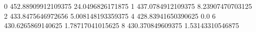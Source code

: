 0 452.88909912109375 24.0496826171875
1 437.0784912109375 8.23907470703125
2 433.8475646972656 5.008148193359375
4 428.83941650390625 0.0
6 430.6265869140625 1.78717041015625
8 430.370849609375 1.53143310546875
